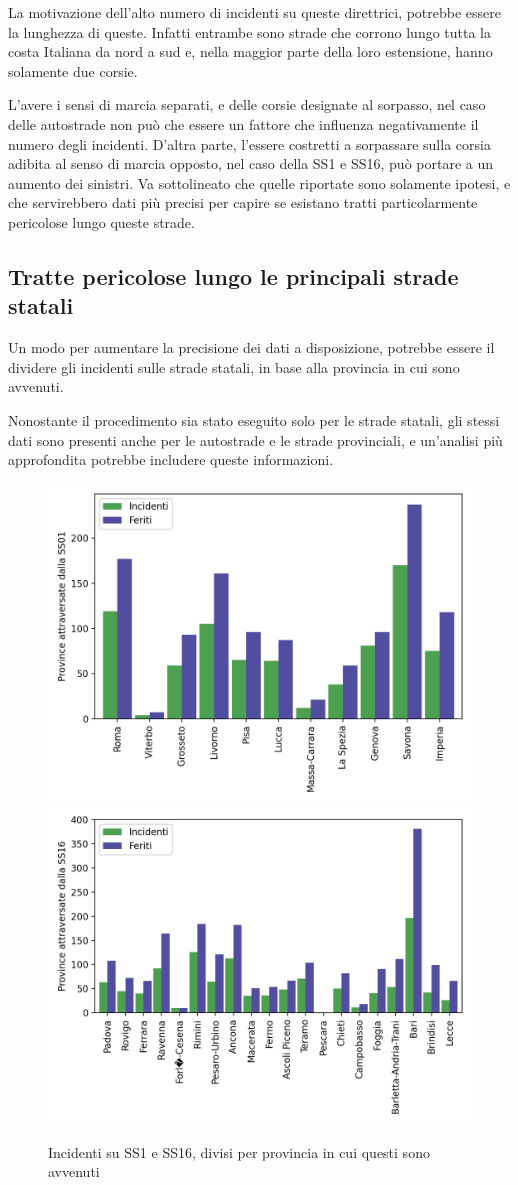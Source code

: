 \documentclass[a4paper,12pt]{report}
\begin{document}
La motivazione dell'alto numero di incidenti su queste direttrici, potrebbe essere 
la lunghezza di queste. Infatti entrambe sono strade che corrono lungo tutta la 
costa Italiana da nord a sud e, nella maggior parte della loro estensione, 
hanno solamente due corsie.

L'avere i sensi di marcia separati, e delle corsie designate al sorpasso, nel caso 
delle autostrade non può che essere un fattore che influenza negativamente 
il numero degli incidenti. 
D'altra parte, l'essere costretti a sorpassare sulla corsia adibita al senso di 
marcia opposto, nel caso della SS1 e SS16, può portare a un aumento dei 
sinistri.
Va sottolineato che quelle riportate sono solamente ipotesi, e che servirebbero 
dati più precisi per capire se esistano tratti particolarmente 
pericolose lungo queste strade.

\subsection{Tratte pericolose lungo le principali strade statali}

Un modo per aumentare la precisione dei dati a disposizione, potrebbe essere il 
dividere gli incidenti sulle strade statali, in base alla provincia in cui sono avvenuti.

Nonostante il procedimento sia stato eseguito solo per le strade statali, gli stessi dati 
sono presenti anche per le autostrade e le strade provinciali, e un'analisi più 
approfondita potrebbe includere queste informazioni.

\begin{figure}
    \includegraphics[width=0.5\linewidth]{../src/incidenti/incidenti_aci/statali/ss01_tratti.png}
    \includegraphics[width=0.5\linewidth]{../src/incidenti/incidenti_aci/statali/ss16_tratti.png}
    \caption{Incidenti su SS1 e SS16, divisi per provincia in cui questi sono avvenuti}
    \label{fig:incidenti-strade-statali}
\end{figure}
\end{document}
